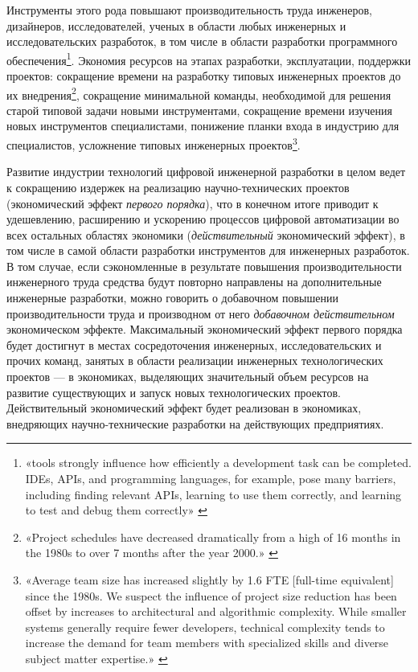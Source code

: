 \documentclass{article}
\begin{document}
Инструменты этого рода повышают производительность труда инженеров, дизайнеров, исследователей, ученых в области любых инженерных и исследовательских разработок, в том числе в области разработки программного обеспечения\footnote{«tools strongly influence how efficiently a development task can be completed. IDEs, APIs, and programming languages, for example, pose many barriers, including finding relevant APIs, learning to use them correctly, and learning to test and debug them correctly» \cite{softwareProductivity2019}}. Экономия ресурсов на этапах разработки, эксплуатации, поддержки проектов: сокращение времени на разработку типовых инженерных проектов до их внедрения\footnote{«Project schedules have decreased dramatically from a high of 16 months in the 1980s to over 7 months after the year 2000.» \cite{typicalSoftProject2019}}, сокращение минимальной команды, необходимой для решения старой типовой задачи новыми инструментами, сокращение времени изучения новых инструментов специалистами, понижение планки входа в индустрию для специалистов, усложнение типовых инженерных проектов\footnote{«Average team size has increased slightly by 1.6 FTE [full-time equivalent] since the 1980s. We suspect the influence of project size reduction has been offset by increases to architectural and algorithmic complexity. While smaller systems generally require fewer developers, technical complexity tends to increase the demand for team members with specialized skills and diverse subject matter expertise.» \cite{typicalSoftProject2019}}.

Развитие индустрии технологий цифровой инженерной разработки в целом ведет к сокращению издержек на реализацию научно-технических проектов (экономический эффект \textit{первого порядка}), что в конечном итоге приводит к удешевлению, расширению и ускорению процессов цифровой автоматизации во всех остальных областях экономики (\textit{действительный} экономический эффект), в том числе в самой области разработки инструментов для инженерных разработок. В том случае, если сэкономленные в результате повышения производительности инженерного труда средства будут повторно направлены на дополнительные инженерные разработки, можно говорить о добавочном повышении производительности труда и производном от него \textit{добавочном действительном} экономическом эффекте. Максимальный экономический эффект первого порядка будет достигнут в местах сосредоточения инженерных, исследовательских и прочих команд, занятых в области реализации инженерных технологических проектов — в экономиках, выделяющих значительный объем ресурсов на развитие существующих и запуск новых технологических проектов. Действительный экономический эффект будет реализован в экономиках, внедряющих научно-технические разработки на действующих предприятиях.
\end{document}
